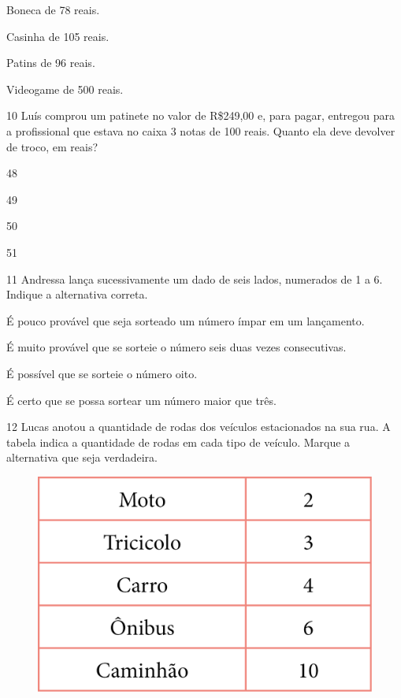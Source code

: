 \begin{escolha}[itemsep=-5pt]
\item Boneca de 78 reais.

\item Casinha de 105 reais.

\item Patins de 96 reais.

\item Videogame de 500 reais.
\end{escolha}

\num{10} Luís comprou um patinete no valor de R\$249,00 e, para pagar, entregou
para a profissional que estava no caixa 3 notas de 100 reais. Quanto ela deve devolver de troco, em reais?

\begin{escolha}[itemsep=-5pt]
\item 48

\item 49

\item 50

\item 51
\end{escolha}

\num{11} Andressa lança sucessivamente um dado de seis lados, numerados de 1 a 6.
Indique a alternativa correta.

\begin{escolha}[itemsep=-5pt]
\item É pouco provável que seja sorteado um número ímpar em um lançamento.

\item É muito provável que se sorteie o número seis duas vezes consecutivas.

\item É possível que se sorteie o número oito.

\item É certo que se possa sortear um número maior que três.
\end{escolha}


\num{12} Lucas anotou a quantidade de rodas dos veículos estacionados na sua rua.
A tabela indica a quantidade de rodas em cada tipo de veículo. Marque a
alternativa que seja verdadeira.

\begin{figure}[H]
\centering
\includegraphics[width=.8\textwidth]{./media/image157.png}
\end{figure}

